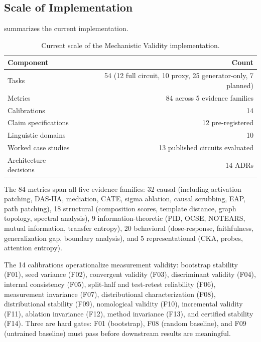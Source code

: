 \documentclass[10pt]{article}
\newcommand{\tighttable}{\setlength{\tabcolsep}{4pt}\renewcommand{\arraystretch}{1.05}}
\begin{document}
\subsection{Scale of Implementation}
\label{sec:scale}

 summarizes the current implementation.

\begin{table}[t]
\centering
\tighttable
\caption{Current scale of the Mechanistic Validity implementation.}
\label{tab:scale}
\small
\begin{tabular}{@{}lr@{}}
\toprule
\textbf{Component} & \textbf{Count} \\
\midrule
Tasks & 54 (12 full circuit, 10 proxy, 25 generator-only, 7 planned) \\
Metrics & 84 across 5 evidence families \\
Calibrations & 14 \\
Claim specifications & 12 pre-registered \\
Linguistic domains & 10 \\
Worked case studies & 13 published circuits evaluated \\
Architecture decisions & 14 ADRs \\
\bottomrule
\end{tabular}
\end{table}

The 84 metrics span all five evidence families: 32 causal (including activation patching, DAS-IIA, mediation, CATE, sigma ablation, causal scrubbing, EAP, path patching), 18 structural (composition scores, template distance, graph topology, spectral analysis), 9 information-theoretic (PID, OCSE, NOTEARS, mutual information, transfer entropy), 20 behavioral (dose-response, faithfulness, generalization gap, boundary analysis), and 5 representational (CKA, probes, attention entropy).

The 14 calibrations operationalize measurement validity: bootstrap stability (F01), seed variance (F02), convergent validity (F03), discriminant validity (F04), internal consistency (F05), split-half and test-retest reliability (F06), measurement invariance (F07), distributional characterization (F08), distributional stability (F09), nomological validity (F10), incremental validity (F11), ablation invariance (F12), method invariance (F13), and certified stability (F14). Three are hard gates: F01 (bootstrap), F08 (random baseline), and F09 (untrained baseline) must pass before downstream results are meaningful.
\end{document}
